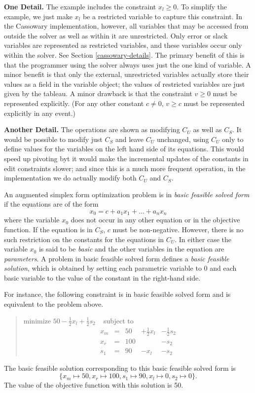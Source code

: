 \documentclass{article}
\begin{document}
{\bf One Detail.}  The example includes the constraint $x_l \geq 0$.  To
simplify the example, we just make $x_l$ be a restricted variable to
capture this constraint.  In the Cassowary implementation, however, all
variables that may be accessed from outside the solver as well as within it
are unrestricted.  Only error or slack variables are represented as
restricted variables, and these variables occur only within the solver.
See Section \ref{cassowary-details}.  The primary benefit of this is
that the programmer using the solver always uses just the one kind of
variable.  A minor benefit is that only the external, unrestricted
variables actually store their values as a field in the variable object;
the values of restricted variables are just given by the tableau.  A minor
drawback is that the constraint $v \geq 0$ must be represented explicitly.
(For any other constant $c \neq 0$, $v \geq c$ must be represented
explicitly in any event.)

{\bf Another Detail.}  The operations are shown as modifying $C_U$ as well
as $C_S$\@.  It would be possible to modify just $C_S$ and leave $C_U$
unchanged, using $C_U$ only to define values for the variables on the left
hand side of its equations.  This would speed up pivoting byt it would make the incremental updates of the constants in edit
constraints slower; and since this is a much more frequent operation, in
the implementation we do actually modify both $C_U$ and $C_S$\@.

An augmented simplex form optimization problem is in 
\emph{basic feasible solved form} if the equations are of the form 
$$x_0 = c + a_1 x_1 + \ldots + a_n x_n$$ where the variable $x_0$ does not
occur in any other equation or in the objective function.  If the equation
is in $C_S$, $c$ must be non-negative.  However, there is no
such restriction on the constants for the equations in $C_U$\@.  In either
case the variable $x_0$ is said to be \emph{basic} and the other
variables in the equation are \emph{parameters}.  A problem in basic
feasible solved form defines a \emph{basic feasible solution}, which is
obtained by setting each parametric variable to 0 and each basic variable
to the value of the constant in the right-hand side.

For instance, the following constraint
is in basic feasible solved form and is equivalent to the 
problem above.
\begin{quote}\vspace*{-1ex}
minimize $50 - \frac{1}{2} x_l + \frac{1}{2} s_2 $ 
~ subject to 
$$
\begin{array}{rlrrr} 
x_m & = &50 & + \frac{1}{2} x_l & - \frac{1}{2} s_2 \\
x_r & = &100 &  & - s_2 \\ \hline
s_1 & = &90 & - x_l &  - s_2 
\end{array}
$$
\end{quote}\vspace{-0.9ex}
The basic feasible solution corresponding to this
basic feasible solved form is 
$$\{x_m \mapsto 50, x_r \mapsto 100, s_1 \mapsto 90, x_l \mapsto 0, 
s_2 \mapsto 0\}.$$
The value of the objective function with this solution is 50.
\end{document}
